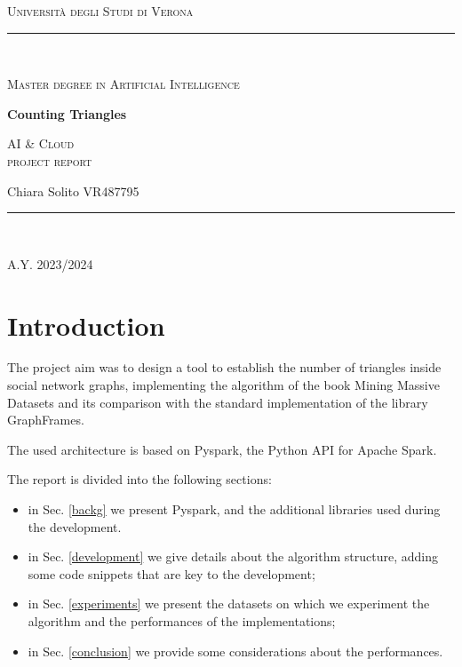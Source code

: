 \documentclass[a4paper,11pt, twoside]{article}
\begin{document}
    \clearpage
    \begin{titlepage}
        \centering
        {\scshape\LARGE Università degli Studi di Verona \par}
        \noindent\rule{\textwidth}{0.5pt}\\
        {\scshape\large Master degree in Artificial Intelligence\par}
        \vspace{6cm}
        {\huge\bfseries Counting Triangles\par}
        \vspace{1cm}
        {\Large\scshape AI \& Cloud \\ \large project report\par}
        \vspace{2cm}
        {\large Chiara Solito VR487795\par}
        \vspace{1cm}
        \vspace{5cm}
        \vspace*{\fill}
        \noindent\rule{\textwidth}{0.5pt}\\
        {\large A.Y. 2023/2024\par}
    \end{titlepage}
    \thispagestyle{empty}
    \newpage
    \tableofcontents
    \newpage
    	
    \section{Introduction}
        The project aim was to design a tool to establish the number of triangles inside social network graphs, implementing the algorithm of the book \textquotedbl  Mining Massive Datasets\textquotedbl \cite{10.5555/2787930} and its comparison with the standard implementation of the library GraphFrames.
    
        The used architecture is based on Pyspark, the Python API for Apache Spark.
    	
        The report is divided into the following sections: 
        \begin{itemize}
            \item in Sec. \ref{backg} we present Pyspark, and the additional libraries used during the development.
            \item in Sec. \ref{development} we give details about the algorithm structure, adding some code snippets that are key to the development;
            \item in Sec. \ref{experiments} we present the datasets on which we experiment the algorithm and the performances of the implementations;
            \item in Sec. \ref{conclusion} we provide some considerations about the performances.
        \end{itemize}
    
\end{document}
